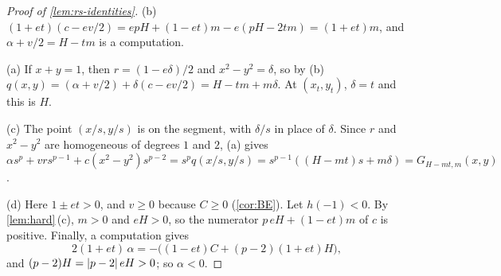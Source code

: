 \begin{proof}[Proof of \cref{lem:rs-identities}]
(b) $(1+et)(c-ev/2)=epH+(1-et)m-e(pH-2tm)=(1+et)m$, and $\alpha+v/2=H-tm$ is a computation.

(a) If $x+y=1$, then $r=(1-e\delta)/2$ and $x^2-y^2=\delta$, so by (b)
$q(x,y)=(\alpha+v/2)+\delta(c-ev/2)=H-tm+m\delta$. At $(x_t,y_t)$, $\delta=t$ and this is $H$.

(c) The point $(x/s,y/s)$ is on the segment, with $\delta/s$ in place of $\delta$. Since $r$ and
$x^2-y^2$ are homogeneous of degrees $1$ and $2$, (a) gives
$\alpha s^p+vrs^{p-1}+c(x^2-y^2)s^{p-2}=s^pq(x/s,y/s)=s^{p-1}((H-mt)s+m\delta)
=G_{H-mt,m}(x,y)$.

(d) Here $1\pm et>0$, and $v\ge0$ because $C\ge0$ (\cref{cor:BE}). Let $h(-1)<0$. By
\cref{lem:hard}\,(c), $m>0$ and $eH>0$, so the numerator $p\,eH+(1-et)m$ of $c$ is positive.
Finally, a computation gives
\[
  2(1+et)\,\alpha=-\bigl((1-et)C+(p-2)(1+et)H\bigr),
\]
and $(p-2)H=\lvert p-2\rvert\,eH>0$; so $\alpha<0$.
\end{proof}

